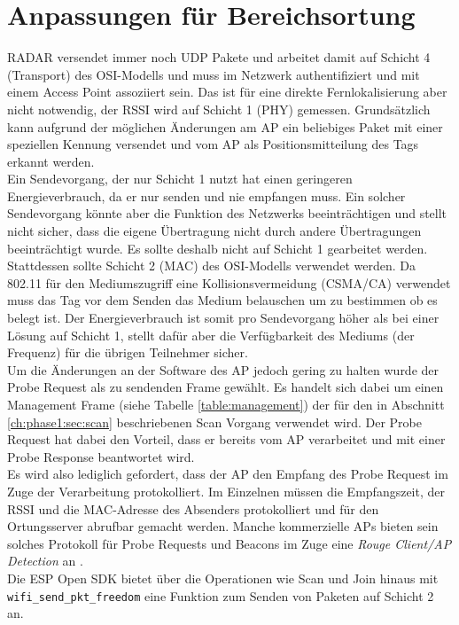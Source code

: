 \section{Anpassungen für Bereichsortung}
\label{ch:phase2:sec:anpassungbereich}
RADAR versendet immer noch UDP Pakete und arbeitet damit auf Schicht 4 (Transport) des OSI-Modells und muss im Netzwerk authentifiziert und mit einem Access Point assoziiert sein.
Das ist für eine direkte Fernlokalisierung aber nicht notwendig, der RSSI wird auf Schicht 1 (PHY) gemessen.
Grundsätzlich kann aufgrund der möglichen Änderungen am AP ein beliebiges Paket mit einer speziellen Kennung versendet und vom AP als Positionsmitteilung des Tags erkannt werden. \\
Ein Sendevorgang, der nur Schicht 1 nutzt hat einen geringeren Energieverbrauch, da er nur senden und nie empfangen muss.
Ein solcher Sendevorgang könnte aber die Funktion des Netzwerks beeinträchtigen und stellt nicht sicher, dass die eigene Übertragung nicht durch andere Übertragungen beeinträchtigt wurde.
Es sollte deshalb nicht auf Schicht 1 gearbeitet werden.\\
Stattdessen sollte Schicht 2 (MAC) des OSI-Modells verwendet werden. Da 802.11 für den Mediumszugriff eine Kollisionsvermeidung (CSMA/CA) verwendet muss das Tag vor dem Senden das Medium belauschen um zu bestimmen ob es belegt ist.
Der Energieverbrauch ist somit pro Sendevorgang höher als bei einer Lösung auf Schicht 1, stellt dafür aber die Verfügbarkeit des Mediums (der Frequenz) für die übrigen Teilnehmer sicher. \\
Um die Änderungen an der Software des AP jedoch gering zu halten wurde der Probe Request als zu sendenden Frame gewählt.
Es handelt sich dabei um einen Management Frame (siehe Tabelle \ref{table:management}) der für den in Abschnitt \ref{ch:phase1:sec:scan} beschriebenen Scan Vorgang verwendet wird.
Der Probe Request hat dabei den Vorteil, dass er bereits vom AP verarbeitet und mit einer Probe Response beantwortet wird. \\
Es wird also lediglich gefordert, dass der AP den Empfang des Probe Request im Zuge der Verarbeitung protokolliert. 
Im Einzelnen müssen die Empfangszeit, der RSSI und die MAC-Adresse des Absenders protokolliert und für den Ortungsserver abrufbar gemacht werden. 
Manche kommerzielle APs bieten sein solches Protokoll für Probe Requests und Beacons im Zuge eine \textit{Rouge Client/AP Detection} an \cite{lancom2017rouge}.\\
Die ESP Open SDK bietet über die Operationen wie Scan und Join hinaus mit \texttt{wifi\_send\_pkt\_freedom} eine Funktion zum Senden von Paketen auf Schicht 2 an.
